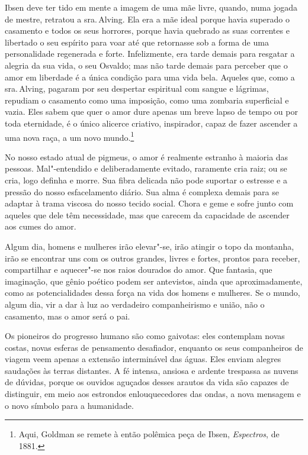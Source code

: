 Ibsen deve ter tido em mente a imagem de uma mãe livre, quando, numa
jogada de mestre, retratou a sra.\,Alving. Ela era a mãe ideal porque
havia superado o casamento e todos os seus horrores, porque havia
quebrado as suas correntes e libertado o seu espírito para voar até que
retornasse sob a forma de uma personalidade regenerada e forte.
Infelizmente, era tarde demais para resgatar a alegria da sua vida, o
seu Osvaldo; mas não tarde demais para perceber que o amor em liberdade
é a única condição para uma vida bela. Aqueles que, como a sra.\,Alving,
pagaram por seu despertar espiritual com sangue e lágrimas, repudiam o
casamento como uma imposição, como uma zombaria superficial e vazia.
Eles sabem que quer o amor dure apenas um breve lapso de tempo ou por
toda eternidade, é o único alicerce criativo, inspirador, capaz de fazer
ascender a uma nova raça, a um novo mundo.\footnote{Aqui, Goldman se remete à então polêmica peça de Ibsen, \textit{Espectros}, de 1881.}

No nosso estado atual de pigmeus, o amor é realmente estranho à maioria
das pessoas. Mal"-entendido e deliberadamente evitado, raramente cria
raiz; ou se cria, logo definha e morre. Sua fibra delicada não pode
suportar o estresse e a pressão do nosso esfacelamento diário. Sua alma é complexa
demais para se adaptar à trama viscosa do nosso tecido social. Chora e
geme e sofre junto com aqueles que dele têm necessidade, mas que carecem
da capacidade de ascender aos cumes do amor.

Algum dia, homens e mulheres irão elevar"-se, irão atingir o topo da
montanha, irão se encontrar uns com os outros grandes, livres e fortes,
prontos para receber, compartilhar e aquecer"-se nos raios dourados do
amor. Que fantasia, que imaginação, que gênio poético podem ser antevistos, ainda que aproximadamente, como as potencialidades dessa força na vida
dos homens e mulheres. Se o mundo, algum dia, vir a dar à luz ao verdadeiro
companheirismo e união, não o casamento, mas o amor será o pai.


Os pioneiros do progresso humano são como gaivotas: eles contemplam
novas costas, novas esferas de pensamento desafiador, enquanto os seus
companheiros de viagem veem apenas a extensão interminável das águas.
Eles enviam alegres saudações às terras distantes. A fé intensa, ansiosa
e ardente trespassa as nuvens de dúvidas, porque os ouvidos aguçados
desses arautos da vida são capazes de distinguir, em meio aos estrondos
enlouquecedores das ondas, a nova mensagem e o novo símbolo para a
humanidade.

